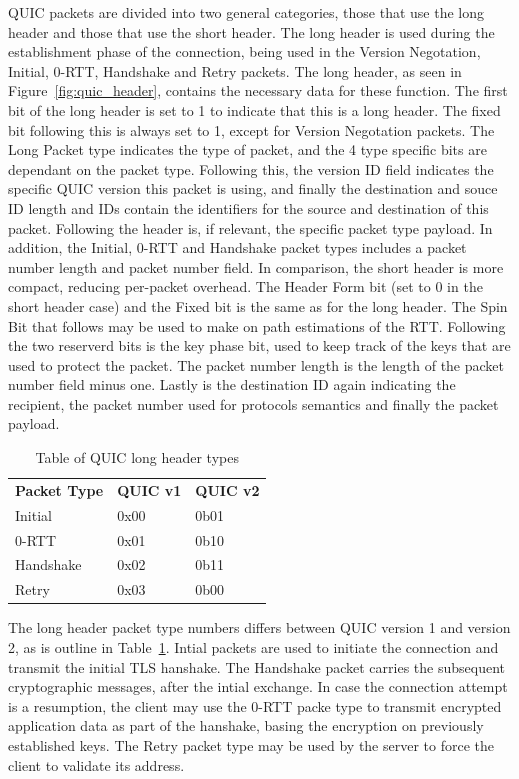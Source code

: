 \documentclass[english, 12pt, a4paper, elec, utf8, a-2b, online]{aaltothesis}
\begin{document}
QUIC packets are divided into two general categories, those that use the long header
and those that use the short header. The long header is used during the establishment
phase of the connection, being used in the Version Negotation, Initial, 0-RTT, Handshake
and Retry packets. The long header, as seen in Figure~\ref{fig:quic_header}, contains the
necessary data for these function. The first bit of the long header is set to 1 to indicate
that this is a long header. The fixed bit following this is always set to 1, except
for Version Negotation packets. The Long Packet type indicates the type of packet,
and the 4 type specific bits are dependant on the packet type. Following this,
the version ID field indicates the specific QUIC version this packet is using, and
finally the destination and souce ID length and IDs contain the identifiers for
the source and destination of this packet. Following the header is, if relevant,
the specific packet type payload. In addition, the Initial, 0-RTT and Handshake
packet types includes a packet number length and packet number field. In comparison,
the short header is more compact, reducing per-packet overhead. The Header Form bit
(set to 0 in the short header case) and the Fixed bit is the same as for the long
header. The Spin Bit that follows may be used to make on path estimations of
the RTT. Following the two reserverd bits is the key phase bit, used to keep
track of the keys that are used to protect the packet. The packet number length
is the length of the packet number field minus one. Lastly is the destination ID
again indicating the recipient, the packet number used for protocols semantics
and finally the packet payload\cite{rfc9000}.

\begin{table}[tb]
	\centering
	\caption{Table of QUIC long header types}
	\label{tab:quic_long_header_types}
	\begin{tabular}{lll}
	\textbf{Packet Type}		  & \textbf{QUIC v1} & \textbf{QUIC v2} \\
	Initial   & 0x00    & 0b01    \\
	0-RTT     & 0x01    & 0b10    \\
	Handshake & 0x02    & 0b11    \\
	Retry     & 0x03    & 0b00   
	\end{tabular}
\end{table}
The long header packet type numbers differs between QUIC version 1 and version 2, as
is outline in Table~\ref{tab:quic_long_header_types}. Intial packets are used to initiate the connection and transmit
the initial TLS hanshake. The Handshake packet carries the subsequent
cryptographic messages, after the intial exchange. In case the connection attempt is
a resumption, the client may use the 0-RTT packe type to transmit encrypted application
data as part of the hanshake, basing the encryption on previously established keys. The
Retry packet type may be used by the server to force the client to
validate its address\cite{rfc9000}.
\end{document}
